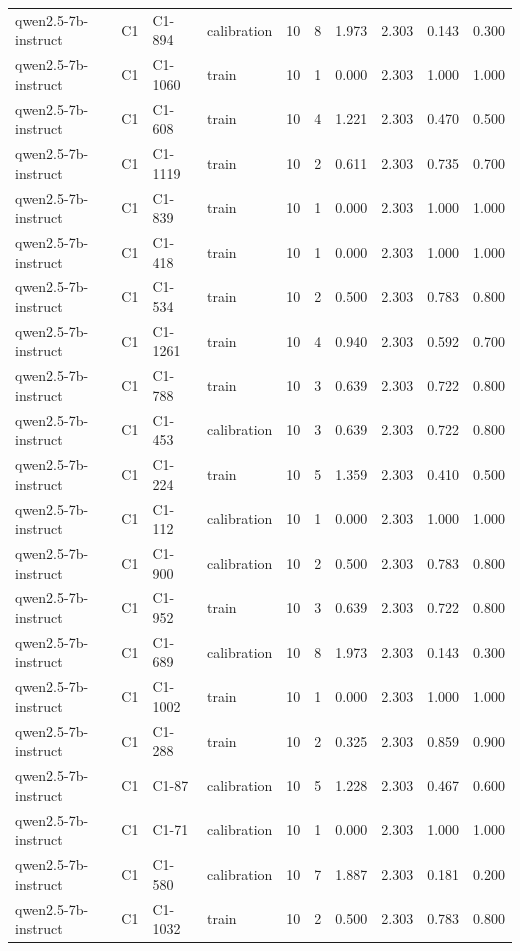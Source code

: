 \begin{table}
\begin{tabular}{llllrrrrrr}
qwen2.5-7b-instruct & C1 & C1-894 & calibration & 10 & 8 & 1.973 & 2.303 & 0.143 & 0.300 \\
qwen2.5-7b-instruct & C1 & C1-1060 & train & 10 & 1 & 0.000 & 2.303 & 1.000 & 1.000 \\
qwen2.5-7b-instruct & C1 & C1-608 & train & 10 & 4 & 1.221 & 2.303 & 0.470 & 0.500 \\
qwen2.5-7b-instruct & C1 & C1-1119 & train & 10 & 2 & 0.611 & 2.303 & 0.735 & 0.700 \\
qwen2.5-7b-instruct & C1 & C1-839 & train & 10 & 1 & 0.000 & 2.303 & 1.000 & 1.000 \\
qwen2.5-7b-instruct & C1 & C1-418 & train & 10 & 1 & 0.000 & 2.303 & 1.000 & 1.000 \\
qwen2.5-7b-instruct & C1 & C1-534 & train & 10 & 2 & 0.500 & 2.303 & 0.783 & 0.800 \\
qwen2.5-7b-instruct & C1 & C1-1261 & train & 10 & 4 & 0.940 & 2.303 & 0.592 & 0.700 \\
qwen2.5-7b-instruct & C1 & C1-788 & train & 10 & 3 & 0.639 & 2.303 & 0.722 & 0.800 \\
qwen2.5-7b-instruct & C1 & C1-453 & calibration & 10 & 3 & 0.639 & 2.303 & 0.722 & 0.800 \\
qwen2.5-7b-instruct & C1 & C1-224 & train & 10 & 5 & 1.359 & 2.303 & 0.410 & 0.500 \\
qwen2.5-7b-instruct & C1 & C1-112 & calibration & 10 & 1 & 0.000 & 2.303 & 1.000 & 1.000 \\
qwen2.5-7b-instruct & C1 & C1-900 & calibration & 10 & 2 & 0.500 & 2.303 & 0.783 & 0.800 \\
qwen2.5-7b-instruct & C1 & C1-952 & train & 10 & 3 & 0.639 & 2.303 & 0.722 & 0.800 \\
qwen2.5-7b-instruct & C1 & C1-689 & calibration & 10 & 8 & 1.973 & 2.303 & 0.143 & 0.300 \\
qwen2.5-7b-instruct & C1 & C1-1002 & train & 10 & 1 & 0.000 & 2.303 & 1.000 & 1.000 \\
qwen2.5-7b-instruct & C1 & C1-288 & train & 10 & 2 & 0.325 & 2.303 & 0.859 & 0.900 \\
qwen2.5-7b-instruct & C1 & C1-87 & calibration & 10 & 5 & 1.228 & 2.303 & 0.467 & 0.600 \\
qwen2.5-7b-instruct & C1 & C1-71 & calibration & 10 & 1 & 0.000 & 2.303 & 1.000 & 1.000 \\
qwen2.5-7b-instruct & C1 & C1-580 & calibration & 10 & 7 & 1.887 & 2.303 & 0.181 & 0.200 \\
qwen2.5-7b-instruct & C1 & C1-1032 & train & 10 & 2 & 0.500 & 2.303 & 0.783 & 0.800 \\

\end{tabular}
\end{table}
